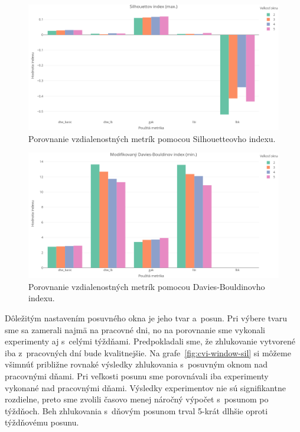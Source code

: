 \documentclass[a4paper,twoside,slovak,12pt,appendix]{article}
\begin{document}
\begin{figure}[htbp]
  \centering
  \includegraphics[width=\textwidth]{cvi/metric_comparison/201902271851-Sil-metric_comparison.png}
  \caption{Porovnanie vzdialenostných metrík pomocou Silhouetteovho indexu.}
	\label{fig:cvi-metric-sil}
\end{figure}
\begin{figure}[htbp]
  \centering
  \includegraphics[width=\textwidth]{cvi/metric_comparison/201902271851-DBstar-metric_comparison.png}
  \caption{Porovnanie vzdialenostných metrík pomocou Davies-Bouldinovho indexu.}
	\label{fig:cvi-metric-dbs}
\end{figure}

\noindent
Dôležitým nastavením posuvného okna je jeho tvar a~posun. Pri výbere tvaru sme
sa zamerali najmä na pracovné dni, no na porovnanie sme vykonali experimenty aj
s~celými týždňami. Predpokladali sme, že zhlukovanie vytvorené iba z~pracovných
dní bude kvalitnejšie. Na grafe~\ref{fig:cvi-window-sil} si môžeme všimnúť
približne rovnaké výsledky zhlukovania s~posuvným oknom nad pracovnými dňami.
Pri veľkosti posunu sme porovnávali iba experimenty vykonané nad pracovnými
dňami. Výsledky experimentov nie sú signifikantne rozdielne, preto sme zvolili
časovo menej náročný výpočet s~posunom po týždňoch. Beh zhlukovania s~dňovým
posunom trval 5-krát dlhšie oproti týždňovému posunu.
\end{document}
